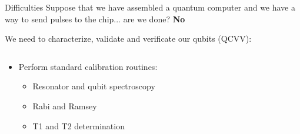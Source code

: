 \documentclass[11pt]{beamer}
\begin{document}
\begin{frame}{Difficulties}
    Suppose that we have assembled a quantum computer and we have a way
    to send pulses to the chip... are we done? {\color{red} \textbf{No} }

    We need to { \color{blue} characterize}, { \color{blue} validate} and { \color{blue} verificate} our qubits (QCVV):
    \begin{columns}
        \begin{column}{0.5 \textwidth}
            \vspace{-2cm}
            \begin{itemize}
                \item[\faCaretSquareORight] Perform standard calibration routines:
                \begin{itemize}
                    \item[\faWrench] Resonator and qubit spectroscopy
                    \item[\faWrench] Rabi and Ramsey 
                    \item[\faWrench] T1 and T2 determination
                

\end{itemize}
\end{itemize}
\end{column}
\end{columns}
\end{frame}
\end{document}
